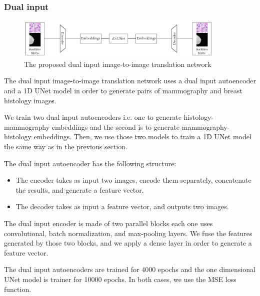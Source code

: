 \documentclass[11pt]{article}
\begin{document}
\subsubsection{Dual input}
\begin{figure}[h!]
  \centering
  \includegraphics[width=10cm]{dual_input.pdf}

\caption{The proposed dual input image-to-image translation network}
\end{figure}


The dual input image-to-image translation network uses a dual input autoencoder and a 1D UNet model in order to generate pairs of mammography and breast histology images. 

We train two dual input autoencoders i.e. one to generate histology-mammography embeddings and the second is to generate mammography-histology embeddings. Then, we use those two models to train a 1D UNet model the same way as in the previous section.

The dual input autoencoder has the following structure:
\begin{itemize}
  \item The encoder takes as input two images, encode them separately, concatenate the results, and generate a feature vector.
  \item The decoder takes as input a feature vector, and outputs two images. 
\end{itemize}

The dual input encoder is made of two parallel blocks each one uses convolutional, batch normalization, and max-pooling layers. We fuse the features generated by those two blocks, and we apply a dense layer in order to generate a feature vector.

The dual input autoencoders are trained for 4000 epochs and the one dimensional UNet model is trainer for 10000 epochs. In both cases, we use the MSE loss function.
 
\end{document}
